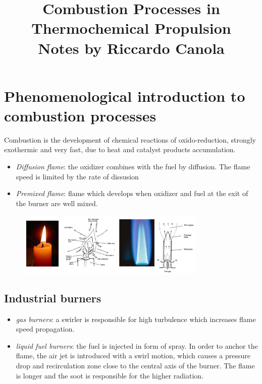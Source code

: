 \documentclass[12pt]{article}
\title{
   Combustion Processes in Thermochemical Propulsion\\
  \large Notes by Riccardo Canola}
\date{}
\begin{document}
\maketitle

\newpage

\tableofcontents

\newpage

\section{Phenomenological introduction to combustion processes}

Combustion is the development of chemical reactions of oxido-reduction, strongly exothermic and very fast, due to heat and catalyst products accumulation.
\begin{itemize}
    \item \textit{Diffusion flame}: the oxidizer combines with the fuel by diffusion. The flame speed is limited by the rate of dissusion
    \item \textit{Premixed flame}: flame which develops when oxidizer and fuel at the exit of the burner are well mixed.
\end{itemize}

\begin{figure}[h!]
\centering
\includegraphics[width=0.8\textwidth]{figures/diffusion_premixed.png}
\end{figure}

\subsection{Industrial burners}

\begin{itemize}
    \item \textit{gas burners}: a swirler is responsible for high turbulence which increases flame speed propagation.
    \item \textit{liquid fuel burners}: the fuel is injected in form of spray. In order to anchor the flame, the air jet is introduced with a swirl motion, which causes a pressure drop and recirculation zone close to the central axis of the burner. The flame is longer and the soot is responsible for the higher radiation.
\end{itemize}
\end{document}
